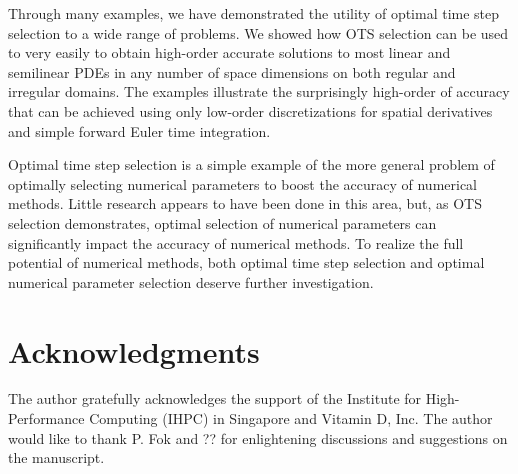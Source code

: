 \documentclass[oneeqnum,onefignum,onetabnum,onethmnum]{siamltex}
\begin{document}
Through many examples, we have demonstrated the utility of optimal time step
selection to a wide range of problems.  We showed how OTS selection can be 
used to very easily to obtain high-order accurate solutions to most linear 
and semilinear PDEs in any number of space dimensions on both regular
and irregular domains.  The examples illustrate the surprisingly high-order
of accuracy that can be achieved using only low-order discretizations for 
spatial derivatives and simple forward Euler time integration.

Optimal time step selection is a simple example of the more general problem
of optimally selecting numerical parameters to boost the accuracy of 
numerical methods.  Little research appears to have been done in this area,
but, as OTS selection demonstrates, optimal selection of numerical parameters 
can significantly impact the accuracy of numerical methods.  To realize
the full potential of numerical methods, both optimal time step selection 
and optimal numerical parameter selection deserve further investigation.


\section*{Acknowledgments}
The author gratefully acknowledges the support of the Institute for 
High-Performance Computing (IHPC) in Singapore and Vitamin D, Inc.
The author would like to thank P. Fok and ?? for enlightening discussions 
and suggestions on the manuscript.


\end{document}
